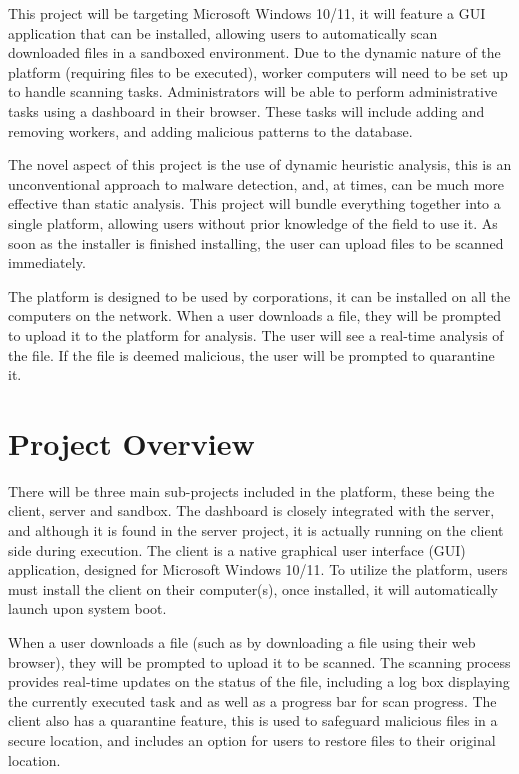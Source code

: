 This project will be targeting Microsoft Windows 10/11,
it will feature a GUI application that can be installed,
allowing users to automatically scan downloaded files in a sandboxed environment.
Due to the dynamic nature of the platform (requiring files to be executed),
worker computers will need to be set up to handle scanning tasks.
Administrators will be able to perform administrative
tasks using a dashboard in their browser.
These tasks will include adding and removing workers,
and adding malicious patterns to the database.

The novel aspect of this project is the use of dynamic heuristic analysis,
this is an unconventional approach to malware detection,
and, at times, can be much more effective than static analysis.
This project will bundle everything together into a single platform,
allowing users without prior knowledge of the field to use it.
As soon as the installer is finished installing,
the user can upload files to be scanned immediately.

The platform is designed to be used by corporations,
it can be installed on all the computers on the network.
When a user downloads a file, they will be prompted to
upload it to the platform for analysis.
The user will see a real-time analysis of the file.
If the file is deemed malicious, the user will be prompted to quarantine it.

\section{Project Overview}
There will be three main sub-projects included in the platform,
these being the client, server and sandbox.
The dashboard is closely integrated with the server,
and although it is found in the server project,
it is actually running on the client side during execution.
The client is a native graphical user interface (GUI) application,
designed for Microsoft Windows 10/11.
To utilize the platform, users must install the client on their computer(s),
once installed, it will automatically launch upon system boot.

When a user downloads a file
(such as by downloading a file using their web browser),
they will be prompted to upload it to be scanned.
The scanning process provides real-time updates on the status of the file,
including a log box displaying the currently executed task
and as well as a progress bar for scan progress.
The client also has a quarantine feature,
this is used to safeguard malicious files in a secure location,
and includes an option for users to restore files to their original location.

